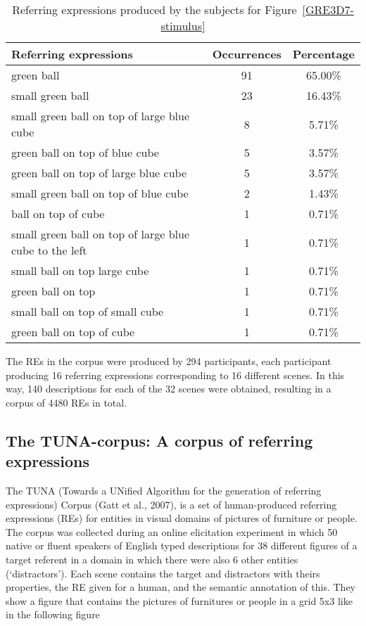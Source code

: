 \begin{table}[h!]
\begin{center}
\begin{tabular}{|l|c|c|}
\hline
Referring expressions & Occurrences & Percentage \\
\hline
green ball & 91 & 65.00\% \\
small green ball & 23 & 16.43\% \\
small green ball on top of large blue cube & 8 & 5.71\% \\
green ball on top of blue cube & 5 & 3.57\% \\
green ball on top of large blue cube & 5 & 3.57\% \\
small green ball on top of blue cube & 2 & 1.43\% \\
ball on top of cube & 1 & 0.71\% \\
small green ball on top of large blue cube to the left & 1 & 0.71\% \\
small ball on top large cube & 1 & 0.71\% \\
green ball on top & 1 & 0.71\% \\
small ball on top of small cube & 1 & 0.71\% \\
green ball on top of cube & 1 & 0.71\% \\
\hline
\end{tabular}
\caption{Referring expressions produced by the subjects for Figure~\ref{GRE3D7-stimulus}\label{corpus-distribution}}
\end{center}
\end{table}

The REs in the corpus were produced by 294 participants, each participant producing 16 referring expressions corresponding to 16 
different scenes. In this way, 140 descriptions for each of the 32 scenes were obtained, resulting in a corpus of 4480 REs in total. 


\subsection{The TUNA-corpus: A corpus of referring expressions}
\label{sec:learningTUNA}

The TUNA (Towards a UNified Algorithm for the generation of referring expressions) Corpus (Gatt et al., 2007), is a set of human-produced referring expressions (REs) for entities in visual domains of
pictures of furniture or people. The corpus was
collected during an online elicitation experiment in
which 50 native or fluent speakers of English typed descriptions for 38 different figures of a target referent
in a domain in which there were also 6 other entities (‘distractors’). 
Each scene contains the target and distractors with theirs properties, the RE given for a human, and the semantic annotation of this.   
They show a figure that contains the pictures of furnitures or people in a grid 5x3 like in the following figure



